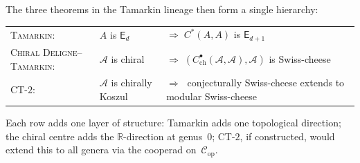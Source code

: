 \documentclass[11pt]{article}
\newcommand{\cA}{\mathcal{A}}
\newcommand{\cC}{\mathcal{C}}
\newcommand{\bR}{\mathbb{R}}
\begin{document}
\noindent
The three theorems in the Tamarkin lineage then form a single
hierarchy:
\begin{center}
\renewcommand{\arraystretch}{1.4}
\begin{tabular}{@{}lll@{}}
\textsc{Tamarkin:}
  & $A$ is $\mathsf{E}_d$
  & $\Longrightarrow\; C^*(A,A)$ is $\mathsf{E}_{d+1}$ \\
\textsc{Chiral Deligne--Tamarkin:}
  & $\cA$ is chiral
  & $\Longrightarrow\; (C^\bullet_{\mathrm{ch}}(\cA,\cA), \cA)$
    is Swiss-cheese \\
\textsc{CT-$2$:}
  & $\cA$ is chirally Koszul
  & $\Longrightarrow\;$ conjecturally Swiss-cheese extends to
    modular Swiss-cheese
\end{tabular}
\end{center}
Each row adds one layer of structure:
Tamarkin adds one topological direction;
the chiral centre adds the $\bR$-direction at genus~$0$;
CT-$2$, if constructed, would extend this to all genera via the
cooperad on~$\cC_{\mathrm{op}}$.
\end{document}
